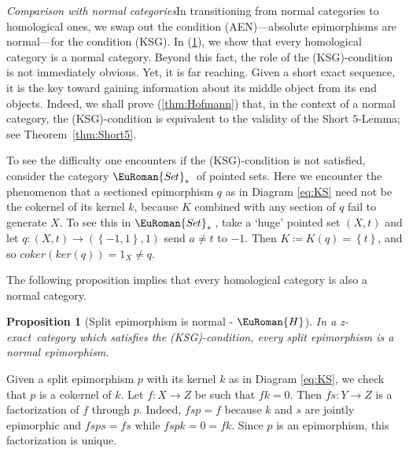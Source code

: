 \documentclass [12pt,oneside]{book}%
\makeatletter
\theoremstyle{captionstyle}  %
\newtheorem{proposition}[theorem]{Proposition}
\renewenvironment{proof}[1][\proofname]{\vspace{-2ex}\par       %
	\pushQED{\qed}%
	\normalfont \topsep6\p@\@plus6\p@\relax
	\trivlist
	\item[\hskip\labelsep
	            \color{proofcaption}\bfseries                %
	            #1\@addpunct{\quad}]\ignorespaces
}{%
	\popQED\endtrivlist\@endpefalse
}
\newcommand{\DefEq}{\coloneq} 		%
\newcommand{\from}{\colon}				%
\newcommand{\IdMapOn}[1]{1_{#1}}	%
\newcommand{\Set}[1]{\left\{#1\right\}}		%
\newcommand{\SetsBsd}{\EuRoman{S{\kern-0.12ex}e{\hskip-0.14ex}t}_{\ast}\,}	%
\newcommand{\ZExact}{z-exact}									%
\newcommand{\Ker}[1]{\textit{K}(#1)}		     	%
\newcommand{\KerMap}[1]{\textit{ker}(#1)}		     	%
\newcommand{\CoKerMap}[1]{\textit{coker}(#1)}						        %
\newcommand{\HTag}{ - {\color{Brown} $\EuRoman{H}$}}																					%
\newcommand{\AENInline}{(AEN)}																%
\newcommand{\KSGInline}{(KSG)}																%
\makeatother
\begin{document}
\emph{Comparison with normal categories}\quad In transitioning from normal categories to homological ones, we swap out the condition \AENInline---absolute epimorphisms are normal---for the condition \KSGInline. In (\ref{thm:SplitEpi->Normal-Homological}), we show that every homological category is a normal category. Beyond this fact, the role of the \KSGInline-condition is not immediately obvious. Yet, it is far reaching. Given a short exact sequence, it is the key toward gaining information about its middle object from its end objects. Indeed, we shall prove (\ref{thm:Hofmann}) that, in the context of a normal category, the \KSGInline-condition is equivalent to the validity of the Short $5$-Lemma; see Theorem~\ref{thm:Short5}.

To see the difficulty one encounters if the \KSGInline-condition is not satisfied, consider the category $\SetsBsd$ of pointed sets. Here we encounter the phenomenon that a sectioned epimorphism $q$ as in Diagram \ref{eq:KS} need not be the cokernel of its kernel $k$, because $K$ combined with any section of $q$ fail to generate $X$. To see this in $\SetsBsd$, take a `huge' pointed set $(X,t)$ and let $q\from (X,t)\to (\Set{-1, 1},1)$ send $a\neq t$ to $-1$. Then $K\DefEq\Ker{q}=\Set{t}$, and so $\CoKerMap{\KerMap{q}} = \IdMapOn{X}\neq q$.

The following proposition implies that every  homological category is also a normal category.

\begin{proposition}[Split epimorphism is normal\HTag]
    \label{thm:SplitEpi->Normal-Homological}%
    In a \ZExact\ category which satisfies the \KSGInline-condition, every split epimorphism is a normal epimorphism.
\end{proposition}
\begin{proof}
    Given a split epimorphism $p$ with its kernel $k$ as in Diagram \ref{eq:KS}, we check that $p$ is a cokernel of $k$. Let $f\from X\to Z$ be such that $fk=0$. Then $fs\from Y\to Z$ is a factorization of $f$ through $p$. Indeed, $fsp=f$ because $k$ and $s$ are jointly epimorphic and $fsps=fs$ while $fspk=0=fk$. Since $p$ is an epimorphism, this factorization is unique.
\end{proof}
\end{document}
